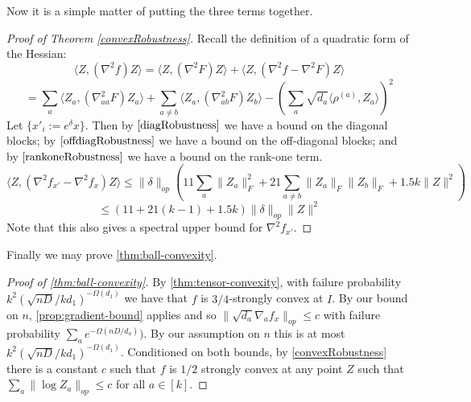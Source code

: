 \documentclass[aos]{imsart}
\theoremstyle{definition}
\newcommand{\samp}{x}
\newcommand{\CF}[1]{{\color{purple}[CF: #1]}}
\newcommand{\AR}[1]{{\color{orange}[AR: #1]}}
\begin{document}
\begin{appendix}
Now it is a simple matter of putting the three terms together.

\begin{proof} [Proof of Theorem \cref{convexRobustness}]
Recall the definition of a quadratic form of the Hessian:
\[ \langle Z, (\nabla^{2} f) Z \rangle = \langle Z, (\nabla^{2} F) Z \rangle + \langle Z, (\nabla^{2} f - \nabla^{2} F) Z \rangle     \]
\[ = \sum_{a} \langle Z_{a}, (\nabla^{2}_{aa} F) Z_{a} \rangle + \sum_{a \neq b} \langle Z_{a}, (\nabla^{2}_{ab} F) Z_{b} \rangle - \left( \sum_{a} \sqrt{d_{a}} \langle \rho^{(a)}, Z_{a} \rangle  \right)^{2}       \]
Let $\{\samp'_{i} := e^{\delta} \samp\}$. Then by $\cref{diagRobustness}$ we have a bound on the diagonal blocks; by $\cref{offdiagRobustness}$ we have a bound on the off-diagonal blocks; and by $\cref{rankoneRobustness}$ we have a bound on the rank-one term.
\[ \langle Z, (\nabla^2 f_{\samp'} - \nabla^{2} f_{\samp}) Z \rangle \leq \|\delta\|_{op} \left( 11 \sum_{a} \|Z_{a}\|_{F}^{2} + 21 \sum_{a \neq b} \|Z_{a}\|_{F} \|Z_{b}\|_{F} + 1.5 k \|Z\|^{2} \right)   \]
\[ \leq (11 + 21(k-1) + 1.5 k) \|\delta\|_{op} \|Z\|^{2}    \]
Note that this also gives a spectral upper bound for $\nabla^{2} f_{\samp'}$.
\end{proof}

Finally we may prove \cref{thm:ball-convexity}.
\begin{proof}[Proof of \cref{thm:ball-convexity}]
By \cref{thm:tensor-convexity}, with failure probability $k^2 ({\sqrt{nD}}/{kd_1})^{ - \Omega(d_1)}$ we have that $f$ is $3/4$-strongly convex at $I$. By our bound on $n$,  \cref{prop:gradient-bound} applies and so $\|\sqrt{d_{a}} \nabla_{a} f_{\samp}\|_{op} \leq c$ with failure probability $\sum_a e^{ - \Omega(nD/d_a)})$. By our assumption on $n$ this is at most $k^2 ({\sqrt{nD}}/{kd_1})^{ - \Omega(d_1)}$. Conditioned on both bounds, by \cref{convexRobustness} there is a constant $c$ such that $f$ is $1/2$ strongly convex at any point $Z$ such that $\sum_a \|\log Z_a\|_{op} \leq  c$ for all $a \in [k]$. \end{proof}










\end{appendix}
\end{document}
